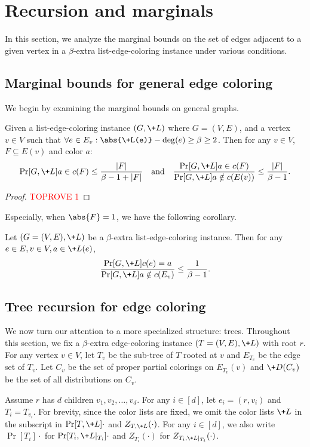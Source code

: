 \documentclass[a4paper,11pt]{article}
\begin{document}
 \section{Recursion and marginals}\label{sec:marginals}
In this section, we analyze the marginal bounds on the set of edges adjacent to a given vertex in a $\beta$-extra list-edge-coloring instance under various conditions.
\subsection{Marginal bounds for general edge coloring}
We begin by examining the marginal bounds on general graphs.
\begin{lemma}\label{lem:claw-marginal-generalized}
     Given a list-edge-coloring instance $(G, \+L)$ where $G=(V, E)$,
     and a vertex $v\in V$ such that $\forall e\in E_{v}: \abs{\+L(e)}-\deg(e) \ge \beta\ge 2$.
    Then for any $v\in V$, $F\subseteq E(v)$ and color $a$:
    \[\Pr[G,\+L]{a\in c(F)} \le \frac{|F|}{\beta - 1 + |F|}\quad\mbox{and}\quad \frac{\Pr[G,\+L]{a\in c(F)}}{\Pr[G,\+L]{a \notin c(E(v))}} \le \frac{|F|}{\beta - 1}.\]
\end{lemma}
\begin{proof}\textcolor{red}{TOPROVE 1}\end{proof}

Especially, when $\abs{F}=1$, we have the following corollary.
\begin{corollary}\label{cor:marginal-bound-gamma-delta}
    Let $(G=(V, E), \+L)$ be a $\beta$-extra list-edge-coloring instance. Then for any $e\in E, v\in V, a\in \+L(e)$, 
    \[
    \frac{\Pr[G,\+L]{c(e)=a}}{\Pr[G,\+L]{a\notin c(E_v)}} \le \frac{1}{\beta-1}.
    \]
\end{corollary}

\subsection{Tree recursion for edge coloring}\label{sec:recursion}
We now turn our attention to a more specialized structure: trees. Throughout this section, we fix a $\beta$-extra edge-coloring instance $(T=(V,E),\+{L})$ with root $r$. For any vertex $v \in V$, let $T_v$ be the sub-tree of $T$ rooted at $v$ and $E_{T_v}$ be the edge set of $T_v$. Let $C_v$ be the set of proper partial colorings on $E_{T_v}(v)$ and $\+D(C_v)$ be the set of all distributions on $C_v$. 

Assume $r$ has $d$ children $v_1, v_2, \dots, v_d$. For any $i\in [d]$, let $e_i = (r, v_i)$ and $T_i = T_{v_i}$. For brevity, since the color lists are fixed, we omit the color lists $\+L$ in the subscript in $\Pr[T,\+L]{\cdot}$ and $Z_{T,\+L}(\cdot)$. For any $i\in [d]$, we also write $\Pr[T_i]{\cdot}$ for $\Pr[T_i, \+L|_{T_i}]{\cdot}$ and $Z_{T_i}(\cdot)$ for $Z_{T_i,\+L|_{T_i}}(\cdot)$.
\end{document}
